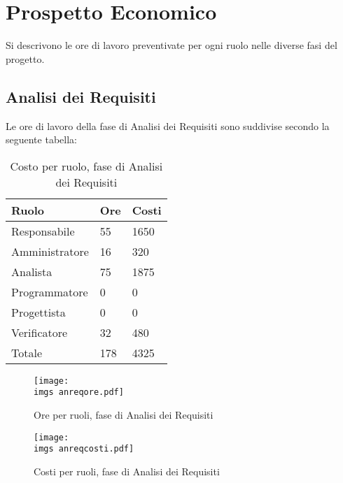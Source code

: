 \section{Prospetto Economico}{
	Si descrivono le ore di lavoro preventivate per ogni ruolo nelle diverse fasi del progetto.
\subsection{Analisi dei Requisiti}{
	Le ore di lavoro della fase di Analisi dei Requisiti sono suddivise secondo la seguente tabella:
	\begin{table}[H]
		\centering
	  \begin{tabular}{p{}p{}
		    							p{}}
		   \toprule Ruolo & Ore & Costi \\
		   \midrule
		   Responsabile & 55 & 1650 \\
		   Amministratore & 16 & 320 \\
		   Analista & 75 & 1875 \\
		   Programmatore & 0 & 0 \\
		   Progettista & 0 & 0 \\
		   Verificatore & 32 & 480 \\
		   Totale & 178 & 4325 \\
		   \bottomrule
	 \end{tabular}
	 	\label{tab:costorequisiti}
	 	\caption{Costo per ruolo, fase di Analisi dei Requisiti}
	\end{table}
	
	\begin{figure}[H]
		\centering
		\texttt{[image: \\imgs anreqore.pdf]}
		\label{fig:orerequisiti}
		\caption{Ore per ruoli, fase di Analisi dei Requisiti}
	\end{figure}
	\begin{figure}[H]
		\centering
		\texttt{[image: \\imgs anreqcosti.pdf]}
		\label{fig:costorequisiti}
		\caption{Costi per ruoli, fase di Analisi dei Requisiti}
	\end{figure}
}
}
